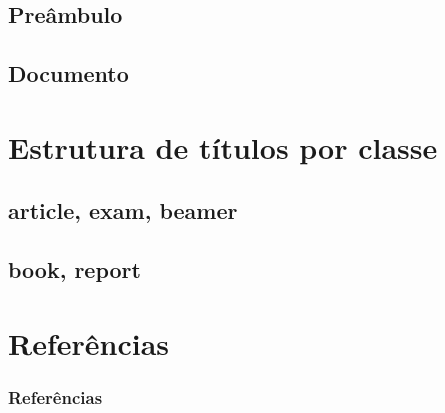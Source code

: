 \documentclass{beamer}
\begin{document}
\subsection{Preâmbulo}
\subsection{Documento}

\section{Estrutura de títulos por classe}
\subsection{article, exam, beamer}
\subsection{book, report}

\section{Referências}
\begin{frame}[allowframebreaks]
    \frametitle{Referências}
    \nocite{WikibooksLatex,BeamerDocumentation,ExamDocumentation,latex24h}
    \printbibliography[]
\end{frame}
\end{document}
